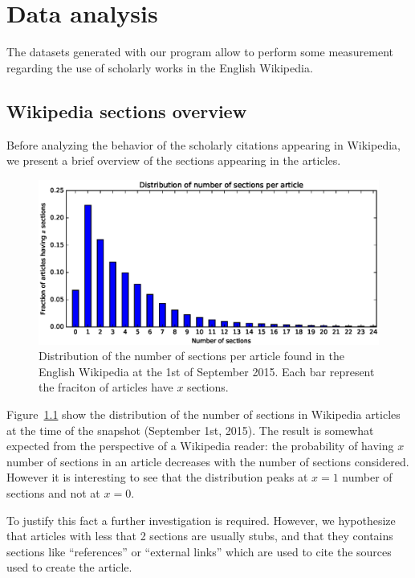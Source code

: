 \cleardoublepage{}
\chapter{Data analysis}
\label{cha:data_analysis}
The datasets generated with our program allow to perform some measurement regarding the use of scholarly works in the English Wikipedia.

\section{Wikipedia sections overview}
Before analyzing the behavior of the scholarly citations appearing in Wikipedia, we present a brief overview of the sections appearing in the articles.

\begin{figure}[h]
\centering
\includegraphics[keepaspectratio=true, width=\textwidth]{assets/section_counts_last_pdf}
\caption{Distribution of the number of sections per article found in the English Wikipedia at the 1st of September 2015.
Each bar represent the fraciton of articles have $x$ sections.}
\label{fig:section_counts_last_pdf}
\end{figure}

Figure~\ref{fig:section_counts_last_pdf} show the distribution of the number of sections in Wikipedia articles at the time of the snapshot (September 1st, 2015).
The result is somewhat expected from the perspective of a Wikipedia reader: the probability of having $x$ number of sections in an article decreases with the number of sections considered.
However it is interesting to see that the distribution peaks at $x = 1$ number of sections and not at $x = 0$.

To justify this fact a further investigation is required.
However, we hypothesize that articles with less that 2 sections are usually stubs, and that they contains sections like ``references'' or ``external links'' which are used to cite the sources used to create the article.

